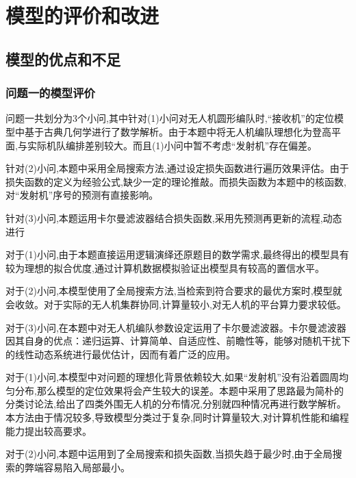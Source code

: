 \documentclass[withoutpreface,bwprint]{cumcmthesis}
\begin{document}
	\section{模型的评价和改进}
	
	\subsection{模型的优点和不足}	
	
	\subsubsection{问题一的模型评价}
	
	
	问题一共划分为3个小问,其中针对(1)小问对无人机圆形编队时,“接收机”的定位模型中基于古典几何学进行了数学解析。由于本题中将无人机编队理想化为登高平面,与实际机队编排差别较大。而且(1)小问中暂不考虑“发射机”存在偏差。
	
	针对(2)小问,本题中采用全局搜索方法,通过设定损失函数进行遍历效果评估。由于损失函数的定义为经验公式,缺少一定的理论推敲。而损失函数为本题中的核函数,对“发射机”序号的预测有直接影响。
	
	针对(3)小问,本题运用卡尔曼滤波器结合损失函数,采用先预测再更新的流程,动态进行
	
	
	对于(1)小问,由于本题直接运用逻辑演绎还原题目的数学需求,最终得出的模型具有较为理想的拟合优度,通过计算机数据模拟验证出模型具有较高的置信水平。
	
	对于(2)小问,本模型使用了全局搜索方法,当检索到符合要求的最优方案时,模型就会收敛。对于实际的无人机集群协同,计算量较小,对无人机的平台算力要求较低。
	
	对于(3)小问,在本题中对无人机编队参数设定运用了卡尔曼滤波器。卡尔曼滤波器因其自身的优点：递归运算、计算简单、自适应性、前瞻性等，能够对随机干扰下的线性动态系统进行最优估计，因而有着广泛的应用。
	
	
	对于(1)小问,本模型中对问题的理想化背景依赖较大,如果“发射机”没有沿着圆周均匀分布,那么模型的定位效果将会产生较大的误差。本题中采用了思路最为简朴的分类讨论法,给出了四类外围无人机的分布情况,分别就四种情况再进行数学解析。本方法由于情况较多,导致模型分类过于复杂,同时计算量较大,对计算机性能和编程能力提出较高要求。
	
	对于(2)小问,本题中运用到了全局搜索和损失函数,当损失趋于最少时,由于全局搜索的弊端容易陷入局部最小。
	
\end{document}
